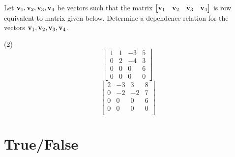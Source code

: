 Let $\mathbf v_1, \mathbf v_2, \mathbf v_3, \mathbf v_4$ be vectors such that the matrix
$\begin{bmatrix} \mathbf v_1 & \mathbf v_2 & \mathbf v_3 & \mathbf v_4 \end{bmatrix}$ is row
equivalent to matrix given below.  Determine a dependence relation for
the vectors $\mathbf v_1, \mathbf v_2, \mathbf v_3, \mathbf v_4$.
\begin{tasks}[resume, style=enumerate](2)
\task
  \begin{displaymath}
    \begin{bmatrix}
      1 & 1 & -3 & 5 \\
      0 & 2 & -4 & 3 \\
      0 & 0 & 0 & 6 \\
      0 & 0 & 0 & 0
    \end{bmatrix}
  \end{displaymath}
\task
  \begin{displaymath}
    \begin{bmatrix}
      2 & -3 & 3 & 8 \\
      0 & -2 & -2 & 7 \\
      0 & 0 & 0 & 6 \\
      0 & 0 & 0 & 0 \\
    \end{bmatrix}
  \end{displaymath}
\end{tasks}

\section{True/False}

\trueFalseHeader

